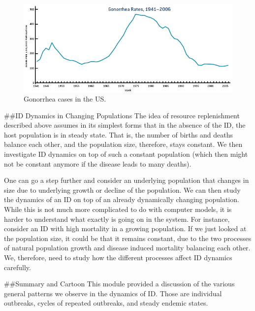 \documentclass[]{book}
\theoremstyle{definition}
\theoremstyle{definition}
\theoremstyle{definition}
\theoremstyle{remark}
\begin{document}
\begin{figure}
\centering
\includegraphics{./images/gonorrhea.png}
\caption{\label{fig:gonorrheapattern}Gonorrhea cases in the US.}
\end{figure}

\#\#ID Dynamics in Changing Populations The idea of resource
replenishment described above assumes in its simplest forms that in the
absence of the ID, the host population is in steady state. That is, the
number of births and deaths balance each other, and the population size,
therefore, stays constant. We then investigate ID dynamics on top of
such a constant population (which then might not be constant anymore if
the disease leads to many deaths).

One can go a step further and consider an underlying population that
changes in size due to underlying growth or decline of the population.
We can then study the dynamics of an ID on top of an already dynamically
changing population. While this is not much more complicated to do with
computer models, it is harder to understand what exactly is going on in
the system. For instance, consider an ID with high mortality in a
growing population. If we just looked at the population size, it could
be that it remains constant, due to the two processes of natural
population growth and disease induced mortality balancing each other.
We, therefore, need to study how the different processes affect ID
dynamics carefully.

\#\#Summary and Cartoon This module provided a discussion of the various
general patterns we observe in the dynamics of ID. Those are individual
outbreaks, cycles of repeated outbreaks, and steady endemic states.
\end{document}
